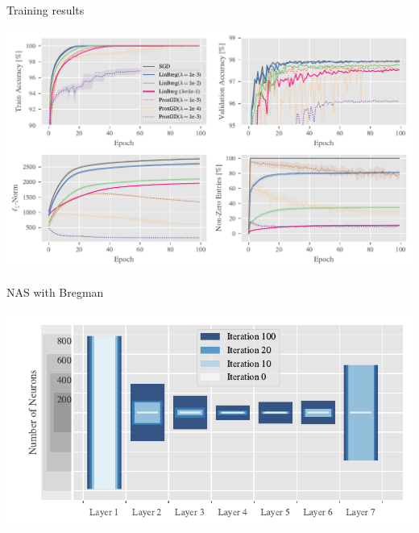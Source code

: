 \begin{minipage}[t]{.5\textwidth}%
Training results

\includegraphics[width=\textwidth]{atelier/SGDvsBreg.pdf}
\end{minipage}%
\hfill%
\begin{minipage}[t]{.5\textwidth}%
NAS with Bregman

\includegraphics[width=\textwidth]{atelier/Encoder_3.pdf}
\end{minipage}%
